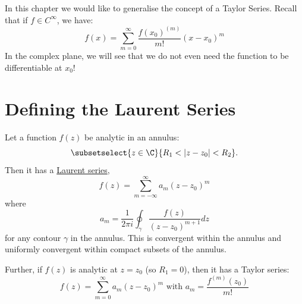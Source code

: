 \documentclass[../Main.tex]{subfiles}
\begin{document}
In this chapter we would like to generalise the concept of a Taylor Series. Recall that if $f \in C^\infty$, we have:
\begin{equation*}
    f(x) = \sum_{m=0}^{\infty} \frac{f(x_0)^{(m)}}{m!}(x - x_0)^m
\end{equation*}
In the complex plane, we will see that we do not even need the function to be differentiable at $x_0$!
\section{Defining the Laurent Series}
\begin{proposition}
    Let a function $f(z)$ be analytic in an annulus:
    \begin{equation*}
        \subsetselect{z \in \C}{R_1 < |z - z_0| < R_2}.
    \end{equation*}
    Then it has a \underline{Laurent series},
    \begin{equation*}
        f(z) = \sum_{m=-\infty}^{\infty} a_m (z - z_0)^m
    \end{equation*}
    where
    \begin{equation*}
        a_m = \frac{1}{2\pi i} \oint_{\gamma} \frac{f(z)}{(z-z_0)^{m+1}} dz
    \end{equation*}
    for any contour $\gamma$ in the annulus. This is convergent within the annulus and uniformly convergent within compact subsets of the annulus.

    Further, if $f(z)$ is analytic at $z = z_0$ (so $R_1 = 0$), then it has a Taylor series:
    \begin{equation*}
        f(z) = \sum_{m=0}^{\infty} a_m (z - z_0)^m \text{ with } a_m = \frac{f^{(m)}(z_0)}{m!}
    \end{equation*}
    \label{propLaurent}
\end{proposition}
\end{document}

